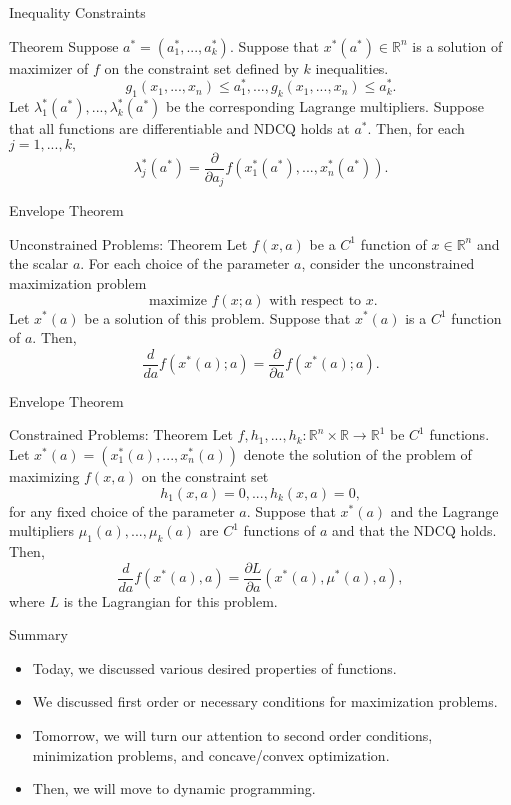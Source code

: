\documentclass{beamer}
\begin{document}
\begin{frame}{Inequality Constraints}
   \begin{block}{Theorem}
      Suppose $a^*=(a_1^*,..., a_k^*)$. Suppose that $x^*(a^*)\in \mathbb{R}^n$ is a solution of maximizer of $f$ on the constraint set defined by $k$ inequalities. 
    \[g_1(x_1,..., x_n)\leq a_1^*,..., g_k(x_1,..., x_n)\leq a_k^*.
    \]
    Let $\lambda_1^*(a^*),...,\lambda_k^*(a^*) $ be the corresponding Lagrange multipliers. Suppose that all functions are differentiable and NDCQ holds at $a^*$. Then, for each $j=1,..., k,$
    \[\lambda_j^*(a^*)=\frac{\partial }{\partial a_j}f(x_1^*(a^*),..., x_n^*(a^*)).
    \]
\end{block} 
\end{frame}

\begin{frame}{Envelope Theorem}
    \begin{block}{Unconstrained Problems: Theorem}
    Let $f(x, a)$ be a $C^1$ function of $x\in \mathbb{R}^n$ and the scalar $a$. For each choice of the parameter $a$, consider the unconstrained maximization problem
    \[\text{ maximize } f(x;a) \text{ with respect to }x.
    \]
        Let $x^*(a)$ be a solution of this problem. Suppose that $x^*(a)$ is a $C^1$ function of $a$. Then, 
        \[\frac{d}{da}f(x^*(a);a)=\frac{\partial}{\partial a }f(x^*(a); a).
        \]
        
\end{block} 
\end{frame}

\begin{frame}{Envelope Theorem}
    \begin{block}{Constrained Problems: Theorem}
    Let $f, h_1,...,h_k:\mathbb{R}^n\times \mathbb{R}\to \mathbb{R}^1$ be $C^1$ functions. Let $x^*(a)=(x_1^*(a),..., x_n^*(a))$ denote the solution of the problem of maximizing $f(x,a)$ on the constraint set 
    \[h_1(x,a)=0,..., h_k(x,a)=0,
    \]
    for any fixed choice of the parameter $a$. Suppose that $x^*(a)$ and the Lagrange multipliers $\mu_1(a),..., \mu_k(a)$ are $C^1$ functions of $a$ and that the NDCQ holds. Then, 
    \[\frac{d}{da}f(x^*(a), a)=\frac{\partial L}{\partial a}(x^*(a), \mu^*(a),a),
    \]
    where $L$ is the Lagrangian for this problem. 
    \end{block}
\end{frame}


\begin{frame}{Summary}
    
    \begin{itemize}
        \item Today, we discussed various desired properties of functions. 
        \item We discussed first order or necessary conditions for maximization problems. 
        \item Tomorrow, we will turn our attention to second order conditions, minimization problems, and concave/convex optimization. 
        \item Then, we will move to dynamic programming. 
    \end{itemize}
\end{frame}
\end{document}
